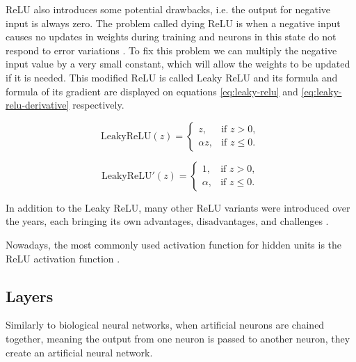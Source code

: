 ReLU also introduces some potential drawbacks, i.e. the output for negative input is always zero. The problem called dying ReLU \cite{Dubey2022, Santosh2022-2, Aby2025} is when a negative input causes no updates in weights during training  and neurons in this state do not respond to error variations \cite{Santosh2022-2}. To fix this problem we can multiply the negative input value by a very small constant, which will allow the weights to be updated if it is needed. This modified ReLU is called Leaky ReLU \cite{Maas2013} and its formula and formula of its gradient are displayed on equations \ref{eq:leaky-relu} and \ref{eq:leaky-relu-derivative} respectively.

\noindent
\begin{multicols}{2} %
    \begin{equation}
    \text{LeakyReLU}(z) =
    \begin{cases} 
        z, & \text{if } z > 0, \\
        \alpha z, & \text{if } z \leq 0.
    \end{cases}
    \label{eq:leaky-relu}
    \end{equation}

    \begin{equation}
    \text{LeakyReLU}'(z) =
    \begin{cases} 
        1, & \text{if } z > 0, \\
        \alpha, & \text{if } z \leq 0.
    \end{cases}
    \label{eq:leaky-relu-derivative}
    \end{equation}
\end{multicols}

In addition to the Leaky ReLU, many other ReLU variants were introduced over the years, each bringing its own advantages, disadvantages, and challenges \cite{Dubey2022, Aby2025}.

Nowadays, the most commonly used activation function for hidden units is the ReLU activation function \cite{Dubey2022, Goodfellow2016}.

\subsection{Layers}

Similarly to biological neural networks, when artificial neurons are chained together, meaning the output from one neuron is passed to another neuron, they create an artificial neural network.

